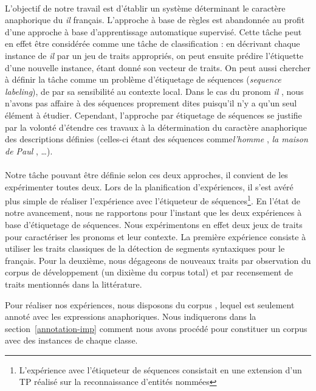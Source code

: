 \documentclass[a4paper,12pt]{article}
\begin{document}
\paragraph{}
L'objectif de notre travail est d'établir un système déterminant le caractère anaphorique du \og{}\textit{il}\fg{} français. L'approche à base de règles est abandonnée au profit d'une approche à base d'apprentissage automatique supervisé. Cette tâche peut en effet être considérée comme une tâche de classification : en décrivant chaque instance de \og \textit{il} \fg{} par un jeu de traits appropriés, on peut ensuite prédire l'étiquette d'une nouvelle instance, étant donné son vecteur de traits. On peut aussi chercher à définir la tâche comme un problème d'étiquetage de séquences (\emph{sequence labeling}), de par sa sensibilité au contexte local. Dans le cas du pronom \og \textit{il} \fg{}, nous n'avons pas affaire à des séquences proprement dites puisqu'il n'y a qu'un seul élément à étudier. Cependant, l'approche par étiquetage de séquences se justifie par la volonté d'étendre ces travaux à la détermination du caractère anaphorique des descriptions définies (celles-ci étant des séquences comme\og \textit{l'homme} \fg{}, \og \textit{la maison de Paul} \fg{}, \ldots).

\paragraph{}
Notre tâche pouvant être définie selon ces deux approches, il convient de les expérimenter toutes deux. Lors de la planification d'expériences, il s'est avéré plus simple de réaliser l'expérience avec l'étiqueteur de séquences\footnote{\samepage L'expérience avec l'étiqueteur de séquences consistait en une extension d'un TP réalisé sur la reconnaissance d'entités nommées}.
En l'état de notre avancement, nous ne rapportons pour l'instant que les deux expériences à base d'étiquetage de séquences.
Nous expérimentons en effet deux jeux de traits pour caractériser les pronoms et leur contexte.
La première expérience consiste à utiliser les traits classiques de la détection de segments syntaxiques pour le français. Pour la deuxième, nous dégageons de nouveaux traits par observation du corpus de développement (un dixième du corpus total) et par recensement de traits mentionnés dans la littérature.

Pour réaliser nos expériences, nous disposons du corpus \cite{tutin-hal-00373327}, lequel est seulement annoté avec les expressions anaphoriques. Nous indiquerons dans la section~\ref{annotation-imp} comment nous avons procédé pour constituer un corpus avec des instances de chaque classe.
\end{document}

